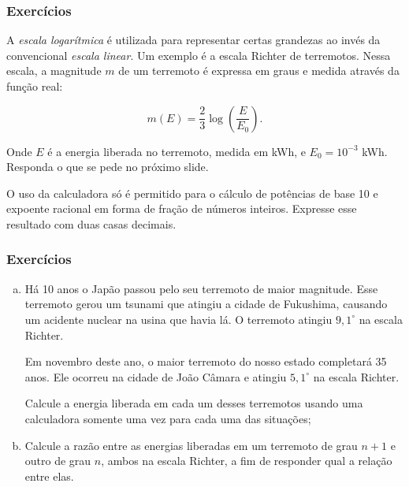 \begin{frame}
\frametitle{Exercícios}

\begin{exercise}
    A \emph{escala logarítmica} é utilizada para representar certas grandezas ao invés da convencional \emph{escala linear}. Um exemplo é a escala Richter de terremotos. Nessa escala, a magnitude $m$ de um terremoto é expressa em graus e medida através da função real:

    $$m (E) = \dfrac{2}{3} \log \left( \dfrac E {E_0} \right).$$

    Onde $E$ é a energia liberada no terremoto, medida em kWh, e $E_0 = 10^{-3}$ kWh. Responda o que se pede no próximo slide.
	\begin{remark}
		O uso da calculadora só é permitido para o cálculo de potências de base 10 e expoente racional em forma de fração de números inteiros. Expresse esse resultado com duas casas decimais.
   \end{remark}
\end{exercise}

\end{frame}



\begin{frame}
\frametitle{Exercícios}

    \begin{enumerate}[(a)]
        \item Há 10 anos o Japão passou pelo seu terremoto de maior magnitude. Esse terremoto  gerou um tsunami que atingiu a cidade de Fukushima, causando um acidente nuclear na usina que havia lá. O terremoto atingiu $9{,}1^\circ $ na escala Richter.

        Em novembro deste ano, o maior terremoto do nosso estado completará 35 anos. Ele ocorreu na cidade de João Câmara e atingiu $5{,}1^\circ$ na escala Richter.

        Calcule a energia liberada em cada um desses terremotos usando uma calculadora somente uma vez para cada uma das situações;
        \item Calcule a razão entre as energias liberadas em um terremoto de grau $n+1$ e outro de grau $n$, ambos na escala Richter, a fim de responder qual a relação entre elas.
    \end{enumerate}


\end{frame}



